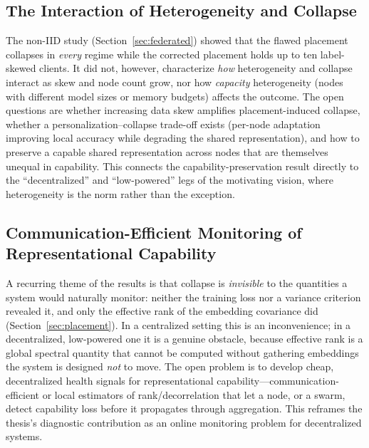 \subsection{The Interaction of Heterogeneity and Collapse}
The non-IID study (Section~\ref{sec:federated}) showed that the flawed
placement collapses in \emph{every} regime while the corrected placement holds
up to ten label-skewed clients. It did not, however, characterize \emph{how}
heterogeneity and collapse interact as skew and node count grow, nor how
\emph{capacity} heterogeneity (nodes with different model sizes or memory
budgets) affects the outcome. The open questions are whether increasing data
skew amplifies placement-induced collapse, whether a personalization--collapse
trade-off exists (per-node adaptation improving local accuracy while degrading
the shared representation), and how to preserve a capable shared representation
across nodes that are themselves unequal in capability. This connects the
capability-preservation result directly to the ``decentralized'' and
``low-powered'' legs of the motivating vision, where heterogeneity is the norm
rather than the exception.

\subsection{Communication-Efficient Monitoring of Representational Capability}
A recurring theme of the results is that collapse is \emph{invisible} to the
quantities a system would naturally monitor: neither the training loss nor a
variance criterion revealed it, and only the effective rank of the embedding
covariance did (Section~\ref{sec:placement}). In a centralized setting this is
an inconvenience; in a decentralized, low-powered one it is a genuine obstacle,
because effective rank is a global spectral quantity that cannot be computed
without gathering embeddings the system is designed \emph{not} to move. The
open problem is to develop cheap, decentralized health signals for
representational capability---communication-efficient or local estimators of
rank/decorrelation that let a node, or a swarm, detect capability loss before
it propagates through aggregation. This reframes the thesis's diagnostic
contribution as an online monitoring problem for decentralized systems.

